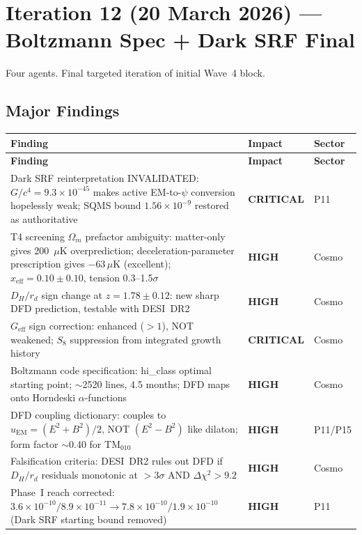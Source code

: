 \documentclass[11pt,a4paper]{article}
\newcommand{\CRITICAL}{\textcolor{critical}{\textbf{CRITICAL}}}
\newcommand{\HIGH}{\textcolor{high}{\textbf{HIGH}}}
\begin{document}
\section{Iteration 12 (20 March 2026) --- Boltzmann Spec + Dark SRF Final}

Four agents.  Final targeted iteration of initial Wave~4 block.

\subsection{Major Findings}

\begin{longtable}{p{}p{}p{}}
\toprule
\textbf{Finding} & \textbf{Impact} & \textbf{Sector} \\
\midrule
\endfirsthead
\midrule
\textbf{Finding} & \textbf{Impact} & \textbf{Sector} \\
\midrule
\endhead
Dark SRF reinterpretation INVALIDATED: $G/c^4=9.3\times10^{-45}$ makes active EM-to-$\psi$ conversion hopelessly weak; SQMS bound $1.56\times10^{-9}$ restored as authoritative & \CRITICAL & P11 \\
T4 screening $\Omega_m$ prefactor ambiguity: matter-only gives 200~$\mu$K overprediction; deceleration-parameter prescription gives $-63\,\mu$K (excellent); $x_\mathrm{eff}=0.10\pm0.10$, tension 0.3--1.5$\sigma$ & \HIGH & Cosmo \\
$D_H/r_d$ sign change at $z=1.78\pm0.12$: new sharp DFD prediction, testable with DESI~DR2 & \HIGH & Cosmo \\
$G_\mathrm{eff}$ sign correction: enhanced ($>1$), NOT weakened; $S_8$ suppression from integrated growth history & \CRITICAL & Cosmo \\
Boltzmann code specification: hi\_class optimal starting point; $\sim$2520 lines, 4.5 months; DFD maps onto Horndeski $\alpha$-functions & \HIGH & Cosmo \\
DFD coupling dictionary: couples to $u_\mathrm{EM}=(E^2+B^2)/2$, NOT $(E^2-B^2)$ like dilaton; form factor $\sim$0.40 for TM$_{010}$ & \HIGH & P11/P15 \\
Falsification criteria: DESI~DR2 rules out DFD if $D_H/r_d$ residuals monotonic at $>3\sigma$ AND $\Delta\chi^2>9.2$ & \HIGH & Cosmo \\
Phase~I reach corrected: $3.6\times10^{-10}/8.9\times10^{-11}\to7.8\times10^{-10}/1.9\times10^{-10}$ (Dark SRF starting bound removed) & \HIGH & P11 \\
\bottomrule
\end{longtable}
\end{document}

